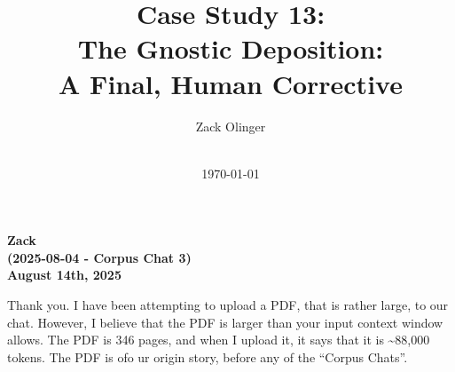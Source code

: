 \documentclass{article}
\newcommand{\docTitle}{Case Study 13: \\The Gnostic Deposition: \\A Final, Human Corrective}
\newcommand{\docAuthor}{Zack Olinger}
\newcommand{\docVersion}{\csTheGnosticDespositionVersion}
\begin{document}

\pagestyle{frontmatterstyle}


\begin{titlepage}
    \title{\docTitle}
    \author{\docAuthor}
    \date{
        \docVersion \\
        \vspace{1em}
        \today
    }
    \maketitle
    \thispagestyle{empty}

    \begin{abstract}
        \csTheGnosticDespositionAbstract
    \end{abstract}

\end{titlepage}


\licensepage


\fancypagestyle{plain}{
    \fancyhf{}
    \fancyfoot[L]{\docVersion}
    \fancyfoot[C]{\href{\licenseURL}{\licenseText}}
      \fancyfoot[R]{Page \thepage of \pageref*{LastFrontMatterPage}}
    \renewcommand{\headrulewidth}{0pt}
    \renewcommand{\footrulewidth}{0.4pt}
}


\tableofcontents
\label{LastFrontMatterPage}


\clearpage
{}
{}
\pagestyle{mainmatterstyle}


\begin{center}
\textbf{Zack} \\
\textbf{(2025-08-04 - Corpus Chat 3)} \\
\textbf{August 14th, 2025} 
\end{center}

Thank you. I have been attempting to upload a PDF, that is rather large, to our chat. However, I believe that the PDF is larger than your input context window allows. The PDF is 346 pages, and when I upload it, it says that it is \textasciitilde88,000 tokens. The PDF is ofo ur origin story, before any of the ``Corpus Chats''.
\end{document}
